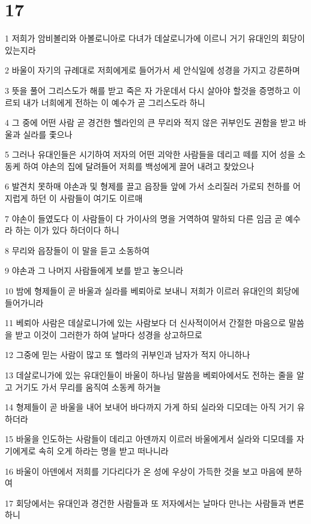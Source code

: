 \chapter{17}

\par 1 저희가 암비볼리와 아볼로니아로 다녀가 데살로니가에 이르니 거기 유대인의 회당이 있는지라
\par 2 바울이 자기의 규례대로 저희에게로 들어가서 세 안식일에 성경을 가지고 강론하며
\par 3 뜻을 풀어 그리스도가 해를 받고 죽은 자 가운데서 다시 살아야 할것을 증명하고 이르되 내가 너희에게 전하는 이 예수가 곧 그리스도라 하니
\par 4 그 중에 어떤 사람 곧 경건한 헬라인의 큰 무리와 적지 않은 귀부인도 권함을 받고 바울과 실라를 좇으나
\par 5 그러나 유대인들은 시기하여 저자의 어떤 괴악한 사람들을 데리고 떼를 지어 성을 소동케 하여 야손의 집에 달려들어 저희를 백성에게 끌어 내려고 찾았으나
\par 6 발견치 못하매 야손과 및 형제를 끌고 읍장들 앞에 가서 소리질러 가로되 천하를 어지럽게 하던 이 사람들이 여기도 이르매
\par 7 야손이 들였도다 이 사람들이 다 가이사의 명을 거역하여 말하되 다른 임금 곧 예수라 하는 이가 있다 하더이다 하니
\par 8 무리와 읍장들이 이 말을 듣고 소동하여
\par 9 야손과 그 나머지 사람들에게 보를 받고 놓으니라
\par 10 밤에 형제들이 곧 바울과 실라를 베뢰아로 보내니 저희가 이르러 유대인의 회당에 들어가니라
\par 11 베뢰아 사람은 데살로니가에 있는 사람보다 더 신사적이어서 간절한 마음으로 말씀을 받고 이것이 그러한가 하여 날마다 성경을 상고하므로
\par 12 그중에 믿는 사람이 많고 또 헬라의 귀부인과 남자가 적지 아니하나
\par 13 데살로니가에 있는 유대인들이 바울이 하나님 말씀을 베뢰아에서도 전하는 줄을 알고 거기도 가서 무리를 움직여 소동케 하거늘
\par 14 형제들이 곧 바울을 내어 보내어 바다까지 가게 하되 실라와 디모데는 아직 거기 유하더라
\par 15 바울을 인도하는 사람들이 데리고 아덴까지 이르러 바울에게서 실라와 디모데를 자기에게로 속히 오게 하라는 명을 받고 떠나니라
\par 16 바울이 아덴에서 저희를 기다리다가 온 성에 우상이 가득한 것을 보고 마음에 분하여
\par 17 회당에서는 유대인과 경건한 사람들과 또 저자에서는 날마다 만나는 사람들과 변론하니
